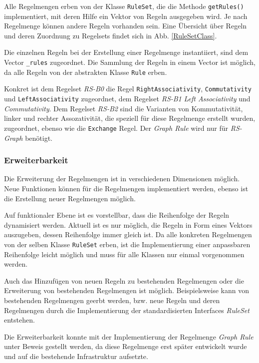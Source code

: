 Alle Regelmengen erben von der Klasse \texttt{RuleSet}, die die Methode \texttt{getRules()} implementiert, mit deren Hilfe ein Vektor von Regeln ausgegeben wird. Je nach Regelmenge können andere Regeln vorhanden sein. Eine Übersicht über Regeln und deren Zuordnung zu Regelsets findet sich in Abb. \ref{RuleSetClass}.

Die einzelnen Regeln bei der Erstellung einer Regelmenge instantiiert, sind dem Vector \texttt{\_rules} zugeordnet. Die Sammlung der Regeln in einem Vector ist möglich, da alle Regeln von der abstrakten Klasse \texttt{Rule} erben. 

Konkret ist dem Regelset \textit{RS-B0} die Regel \texttt{RightAssociativity}, \texttt{Commutativity} und \texttt{LeftAssociativity} zugeordnet, dem Regelset \textit{RS-B1} \textit{Left Associativity} und \textit{Commutativity}. Dem Regelset \textit{RS-B2} sind die Varianten von Kommutativität, linker und rechter Assozativität, die speziell für diese Regelmenge erstellt wurden, zugeordnet, ebenso wie die \texttt{Exchange} Regel. Der \textit{Graph Rule} wird nur für \textit{RS-Graph} benötigt.

\subsubsection{Erweiterbarkeit}
Die Erweiterung der Regelmengen ist in verschiedenen Dimensionen möglich. Neue Funktionen können für die Regelmengen implementiert werden, ebenso ist die Erstellung neuer Regelmengen möglich.

Auf funktionaler Ebene ist es vorstellbar, dass die Reihenfolge der Regeln dynamisiert werden. Aktuell ist es nur möglich, die Regeln in Form eines Vektors auszugeben, dessen Reihenfolge immer gleich ist. Da alle konkreten Regelmengen von der selben Klasse \texttt{RuleSet} erben, ist die Implementierung einer anpassbaren Reihenfolge leicht möglich und muss für alle Klassen nur einmal vorgenommen werden.


Auch das Hinzufügen von neuen Regeln zu bestehenden Regelmengen oder die Erweiterung von bestehenden Regelmengen ist möglich. Beispielsweise kann von bestehenden Regelmengen geerbt werden, bzw. neue Regeln und deren Regelmengen durch die Implementierung der standardisierten Interfaces \textit{RuleSet} entstehen.

Die Erweiterbarkeit konnte mit der Implementierung der Regelmenge  \textit{Graph Rule} unter Beweis gestellt werden, da diese Regelmenge erst später entwickelt wurde und auf die bestehende Infrastruktur aufsetzte.




